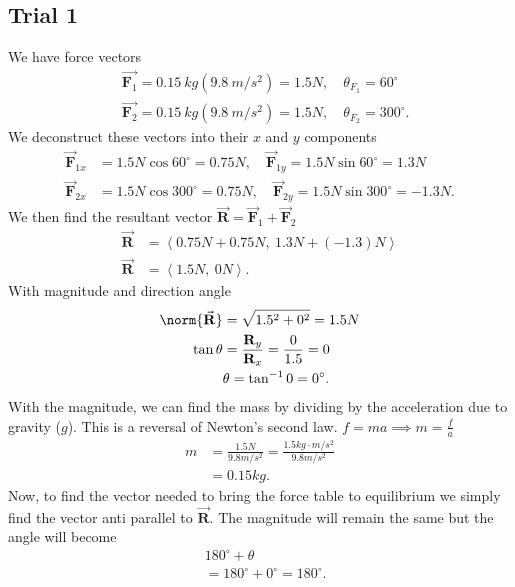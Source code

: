 \documentclass{report}
\begin{document}
    \subsection{Trial 1}
    \bigbreak \noindent 
    We have force vectors 
    \begin{align*}
        &\vec{\mathbf{F}_{1}} = 0.15\ kg(9.8\ m/s^{2}) = 1.5N, \quad \theta_{F_{1}} = 60^{\circ} \\
        &\vec{\mathbf{F}_{2}} = 0.15\ kg(9.8\ m/s^{2}) = 1.5N, \quad \theta_{F_{2}} = 300^{\circ}
    .\end{align*}
    \bigbreak \noindent 
    We deconstruct these vectors into their $x$ and $y$ components
    \begin{align*}
        \vec{\mathbf{F}}_{1x} &= 1.5N\cos{60^{\circ}} = 0.75N, \quad \vec{\mathbf{F}}_{1y} = 1.5N\sin{60^{\circ}} = 1.3N \\
        \vec{\mathbf{F}}_{2x} &= 1.5N\cos{300^{\circ}} = 0.75N, \quad \vec{\mathbf{F}}_{2y} = 1.5N\sin{300^{\circ}} = -1.3N 
    .\end{align*}
    We then find the resultant vector $\vec{\mathbf{R}} = \vec{\mathbf{F}}_{1} + \vec{\mathbf{F}}_{2} $
    \begin{align*}
        \vec{\mathbf{R}} &= \left\langle 0.75N + 0.75N,\ 1.3N + (-1.3)N \right\rangle \\
        \vec{\mathbf{R}} &= \left\langle 1.5N,\ 0N\right\rangle
    .\end{align*}
    With magnitude and direction angle
    \begin{align*}
        \norm{\vec{\mathbf{R}}} &= \sqrt{1.5^{2} + 0^{2}} =1.5N  \\
        \tan{\theta } &= \frac{\mathbf{R}_{y}}{\mathbf{R}_{x}} = \frac{0}{1.5} = 0 \\
        &\theta  = \tan^{-1}{0} = 0^{\circ}
    .\end{align*}
    With the magnitude, we can find the mass by dividing by the acceleration due to gravity ($g$). This is a reversal of Newton's second law. $f=ma \implies m = \frac{f}{a} $
    \begin{align*}
        m &= \frac{1.5N}{9.8m/s^{2}} = \frac{1.5 kg \cdot m/s^{2}}{9.8 m/s^{2}}\\
        &=0.15kg
    .\end{align*}
    Now, to find the vector needed to bring the force table to equilibrium we simply find the vector anti parallel to $\vec{\mathbf{R}}$. The magnitude will remain the same but the angle will become
    \begin{align*}
        &180^{\circ} + \theta \\
        &=180^{\circ} + 0^{\circ} =  180^{\circ}
    .\end{align*}
\end{document}
